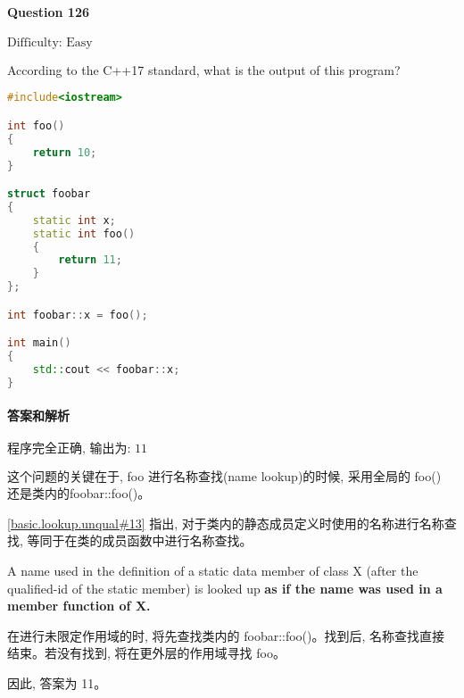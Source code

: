 \documentclass{article}
\begin{document}
	\paragraph*{Question 126} $\boxed{\text{Difficulty: Easy}} $			
	
	According to the C++17 standard, what is the output of this program?
	
	\begin{lstlisting}[language=C++]  		
#include<iostream>

int foo()
{
	return 10;
}

struct foobar
{
	static int x;
	static int foo()
	{
		return 11;
	}
};

int foobar::x = foo();

int main()
{
	std::cout << foobar::x;
}
	\end{lstlisting}
	
	
	\paragraph*{答案和解析} $\boxed{\text{程序完全正确, 输出为: 11}} $
	
	这个问题的关键在于, foo 进行名称查找(name lookup)的时候, 采用全局的 foo() 还是类内的foobar::foo()。
	
	\href{https://timsong-cpp.github.io/cppwp/n4659/basic.lookup.unqual#13}{[basic.lookup.unqual\#13]} 指出, 对于类内的静态成员定义时使用的名称进行名称查找, 等同于在类的成员函数中进行名称查找。
	
	\begin{lightgrayleftbar}
		A name used in the definition of a static data member of class X (after the qualified-id of the static member) is looked up \textbf{as if the name was used in a member function of X.}
	\end{lightgrayleftbar}
	
	在进行未限定作用域的时, 将先查找类内的 foobar::foo()。找到后, 名称查找直接结束。若没有找到, 将在更外层的作用域寻找 foo。
	
	因此, 答案为 11。
	
\end{document}
